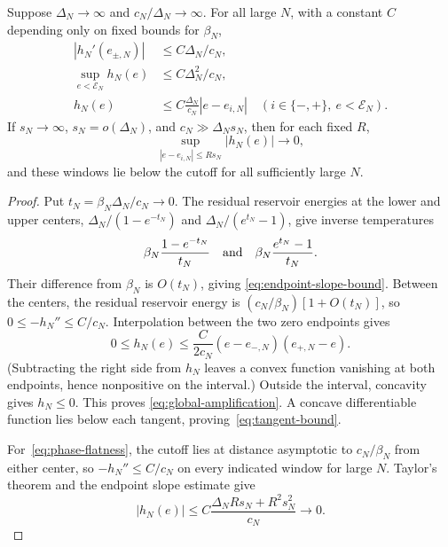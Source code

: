 \begin{lemma}
\label{lem:secant-bounds}
Suppose $\Delta_N\to\infty$ and $c_N/\Delta_N\to\infty$. For all large
$N$, with a constant $C$ depending only on fixed bounds for $\beta_N$,
\begin{align}
 |h_N'(e_{\pm,N})|&\le C\Delta_N/c_N,
 \label{eq:endpoint-slope-bound}\\
 \sup_{e<\mathcal E_N}h_N(e)&\le C\Delta_N^2/c_N,
 \label{eq:global-amplification}\\
 h_N(e)&\le C\frac{\Delta_N}{c_N}|e-e_{i,N}|
 \quad(i\in\{-,+\},\ e<\mathcal E_N).
 \label{eq:tangent-bound}
\end{align}
If $s_N\to\infty$, $s_N=o(\Delta_N)$, and $c_N\gg\Delta_Ns_N$, then for
each fixed $R$,
\begin{equation}
 \sup_{|e-e_{i,N}|\le Rs_N}|h_N(e)|\longrightarrow0,
 \label{eq:phase-flatness}
\end{equation}
and these windows lie below the cutoff for all sufficiently large $N$.
\end{lemma}
\begin{proof}
Put $t_N=\beta_N\Delta_N/c_N\to0$. The residual reservoir energies at
the lower and upper centers, $\Delta_N/(1-e^{-t_N})$ and
$\Delta_N/(e^{t_N}-1)$, give inverse temperatures
\[
 \beta_N\frac{1-e^{-t_N}}{t_N}
 \quad\hbox{and}\quad
 \beta_N\frac{e^{t_N}-1}{t_N}.
\]
Their difference from $\beta_N$ is $O(t_N)$, giving
\eqref{eq:endpoint-slope-bound}. Between the centers, the residual
reservoir energy is $(c_N/\beta_N)[1+O(t_N)]$, so
$0\le-h_N''\le C/c_N$. Interpolation between the two zero endpoints
gives
\[
 0\le h_N(e)\le\frac{C}{2c_N}
 (e-e_{-,N})(e_{+,N}-e).
\]
(Subtracting the right side from $h_N$ leaves a convex function
vanishing at both endpoints, hence nonpositive on the interval.)
Outside the interval, concavity gives $h_N\le0$. This proves
\eqref{eq:global-amplification}. A concave differentiable function lies
below each tangent, proving~\eqref{eq:tangent-bound}.

For~\eqref{eq:phase-flatness}, the cutoff lies at distance asymptotic
to $c_N/\beta_N$ from either center, so $-h_N''\le C/c_N$ on every
indicated window for large $N$. Taylor's theorem and the endpoint
slope estimate give
\[
 |h_N(e)|\le C\frac{\Delta_NRs_N+R^2s_N^2}{c_N}\longrightarrow0.
\]
\end{proof}
